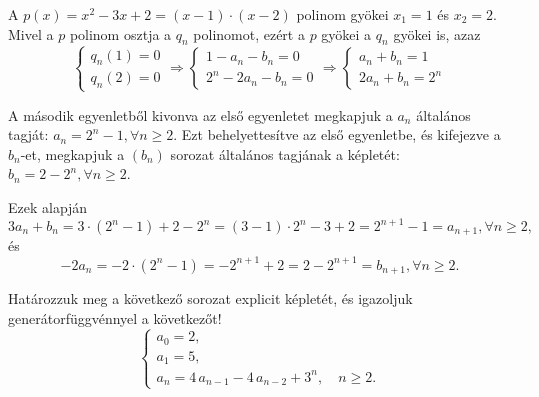 \begin{solution}
A $p(x)=x^{2}-3x+2=(x-1)\cdot(x-2)$ polinom gyökei $x_{1}=1$ és
$x_{2}=2$. Mivel a $p$ polinom osztja a $q_{n}$ polinomot, ezért
a $p$ gyökei a $q_{n}$ gyökei is, azaz 
\[
\left\{ \begin{array}{l}
q_{n}(1)=0\\
q_{n}(2)=0
\end{array}\right.\Rightarrow\left\{ \begin{array}{l}
1-a_{n}-b_{n}=0\\
2^{n}-2a_{n}-b_{n}=0
\end{array}\right.\Rightarrow\left\{ \begin{array}{l}
a_{n}+b_{n}=1\\
2a_{n}+b_{n}=2^{n}
\end{array}\right.
\]

A második egyenletből kivonva az első egyenletet megkapjuk a $a_{n}$
általános tagját: $a_{n}=2^{n}-1,\forall n\geq2$. Ezt behelyettesítve
az első egyenletbe, és kifejezve a $b_{n}$-et, megkapjuk a $(b_{n})$
sorozat általános tagjának a képletét: $b_{n}=2-2^{n},\forall n\geq2$.

Ezek alapján 
\[
3a_{n}+b_{n}=3\cdot(2^{n}-1)+2-2^{n}=(3-1)\cdot2^{n}-3+2=2^{n+1}-1=a_{n+1},\forall n\geq2,
\]
és 
\[
-2a_{n}=-2\cdot(2^{n}-1)=-2^{n+1}+2=2-2^{n+1}=b_{n+1},\forall n\geq2.
\]
\end{solution}
\begin{extraproblem}
Határozzuk meg a következő sorozat explicit képletét, és igazoljuk
generátorfüggvénnyel a következőt! 
\[
\begin{cases}
a_{0}=2,\\
a_{1}=5,\\
a_{n}=4\,a_{n-1}-4\,a_{n-2}+3^{n},\quad n\ge2.
\end{cases}
\]
\end{extraproblem}

\vspace{1em}


